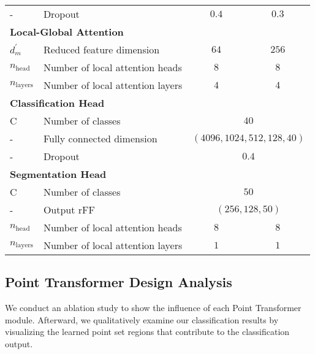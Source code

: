 \documentclass{ieeeaccess}
\begin{document}
\begin{table}[th!]
{\begin{tabular}{@{}llcc@{}}
- & Dropout & $0.4$ & $0.3$ \\
\multicolumn{4}{l}{\textbf{Local-Global Attention}} \\
$d_m^{'}$ & Reduced feature dimension & $64$ & $256$ \\
$n_\text{head}$ & Number of local attention heads & $8$ & $8$ \\
$n_\text{layers}$ & Number of local attention layers & $4$ & $4$ \\
\multicolumn{4}{l}{\textbf{Classification Head}} \\
C & Number of classes & \multicolumn{2}{c}{$40$} \\
- & Fully connected dimension& \multicolumn{2}{c}{$(4096, 1024, 512, 128, 40)$} \\
- & Dropout & \multicolumn{2}{c}{$0.4$} \\
\multicolumn{4}{l}{\textbf{Segmentation Head}} \\
C & Number of classes & \multicolumn{2}{c}{$50$} \\
- & Output rFF& \multicolumn{2}{c}{$(256, 128, 50)$} \\
$n_\text{head}$ & Number of local attention heads & $8$ & $8$ \\
$n_\text{layers}$ & Number of local attention layers & $1$ & $1$ \\
 \bottomrule
 
\end{tabular}
}

\end{table}


\subsection{Point Transformer Design Analysis}
We conduct an ablation study to show the influence of each Point Transformer module. Afterward, we qualitatively examine our classification results by visualizing the learned point set regions that contribute to the classification output. 
\end{document}
